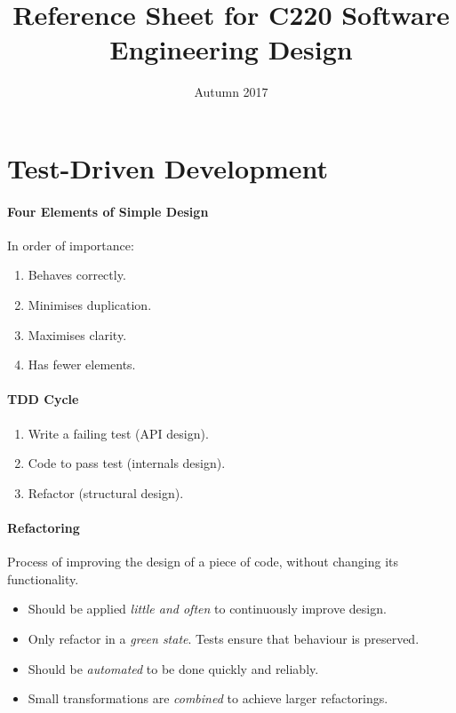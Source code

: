 \documentclass[twocolumn,english]{article}
\begin{document}
\title{Reference Sheet for C220 Software Engineering Design}

\date{Autumn 2017}
\maketitle

\section{Test-Driven Development}

\paragraph{Four Elements of Simple Design}

In order of importance:
\begin{enumerate}
\item Behaves correctly.
\item Minimises duplication.
\item Maximises clarity.
\item Has fewer elements.
\end{enumerate}

\paragraph{TDD Cycle}
\begin{enumerate}
\item Write a failing test (API design).
\item Code to pass test (internals design).
\item Refactor (structural design).
\end{enumerate}

\paragraph{Refactoring}

Process of improving the design of a piece of code, without changing
its functionality.
\begin{itemize}
\item Should be applied \emph{little and often} to continuously improve
design.
\item Only refactor in a \emph{green state}. Tests ensure that behaviour
is preserved.
\item Should be \emph{automated} to be done quickly and reliably.
\item Small transformations are \emph{combined} to achieve larger refactorings.
\end{itemize}
\end{document}
